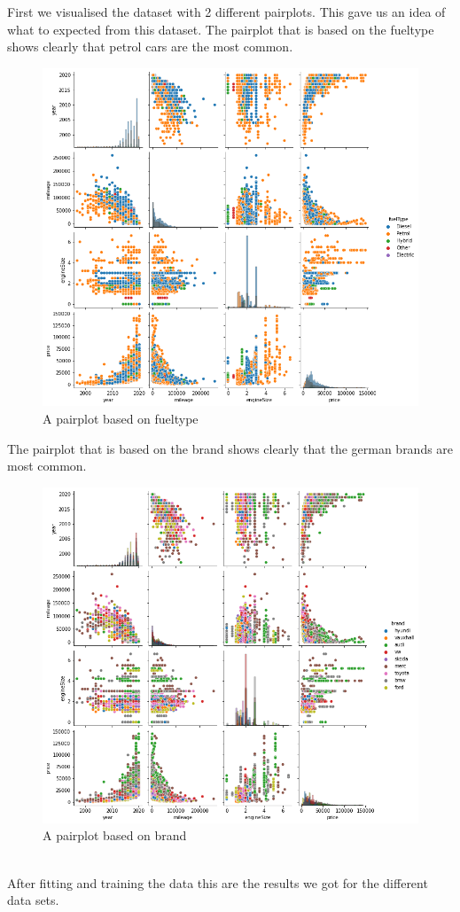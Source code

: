 First we visualised the dataset with 2 different pairplots.
This gave us an idea of what to expected from this dataset.
The pairplot that is based on the fueltype shows clearly that petrol cars are the most common.
\begin{figure}
    \includegraphics[width=\linewidth]{images/pairplot_fueltype.png}
    \caption{A pairplot based on fueltype}
    \label{fig:pairplot fueltype}
\end{figure}
The pairplot that is based on the brand shows clearly that the german brands are most common.
\begin{figure}
    \includegraphics[width=\linewidth]{images/pairplot_brand.png}
    \caption{A pairplot based on brand}
    \label{fig:pairplot brand}
\end{figure}
\\
After fitting and training the data this are the results we got for the different data sets.

